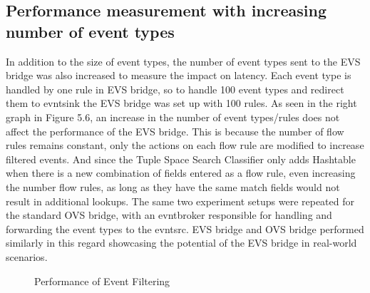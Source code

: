 \subsection{Performance measurement with increasing number of event types } 
In addition to the size of event types, the number of event types sent to the EVS bridge was also increased to measure the impact on latency. Each event type is handled by one rule in EVS bridge, so to handle 100 event types and redirect them to evntsink the EVS bridge was set up with 100 rules. As seen in the right graph in Figure 5.6, an increase in the number of event types/rules does not affect the performance of the EVS bridge. This is because the number of flow rules remains constant, only the actions on each flow rule are modified to increase filtered events. And since the Tuple Space Search Classifier only adds Hashtable when there is a new combination of fields entered as a flow rule, even increasing the number flow rules, as long as they have the same match fields would not result in additional lookups.
The same two experiment setups were repeated for the standard OVS bridge, with an evntbroker responsible for handling and forwarding the event types to the evntsrc. EVS bridge and OVS bridge performed similarly in this regard showcasing the potential of the EVS bridge in real-world scenarios.



\begin{figure}[H]
 \centering
 \caption{Performance of Event Filtering}
\end{figure} 

